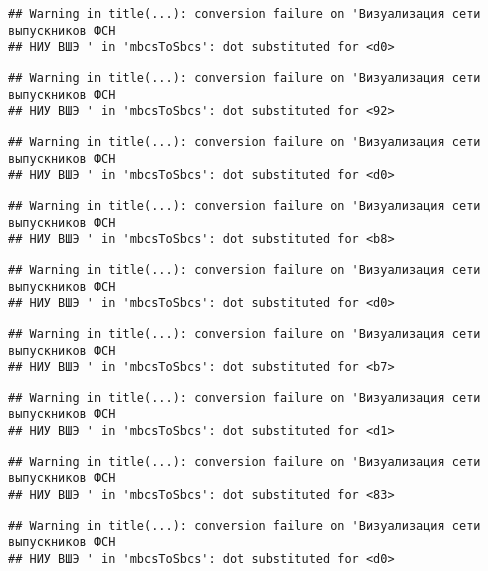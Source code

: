 \documentclass[
]{article}
\begin{document}
\begin{verbatim}
## Warning in title(...): conversion failure on 'Визуализация сети выпускников ФСН
## НИУ ВШЭ ' in 'mbcsToSbcs': dot substituted for <d0>
\end{verbatim}

\begin{verbatim}
## Warning in title(...): conversion failure on 'Визуализация сети выпускников ФСН
## НИУ ВШЭ ' in 'mbcsToSbcs': dot substituted for <92>
\end{verbatim}

\begin{verbatim}
## Warning in title(...): conversion failure on 'Визуализация сети выпускников ФСН
## НИУ ВШЭ ' in 'mbcsToSbcs': dot substituted for <d0>
\end{verbatim}

\begin{verbatim}
## Warning in title(...): conversion failure on 'Визуализация сети выпускников ФСН
## НИУ ВШЭ ' in 'mbcsToSbcs': dot substituted for <b8>
\end{verbatim}

\begin{verbatim}
## Warning in title(...): conversion failure on 'Визуализация сети выпускников ФСН
## НИУ ВШЭ ' in 'mbcsToSbcs': dot substituted for <d0>
\end{verbatim}

\begin{verbatim}
## Warning in title(...): conversion failure on 'Визуализация сети выпускников ФСН
## НИУ ВШЭ ' in 'mbcsToSbcs': dot substituted for <b7>
\end{verbatim}

\begin{verbatim}
## Warning in title(...): conversion failure on 'Визуализация сети выпускников ФСН
## НИУ ВШЭ ' in 'mbcsToSbcs': dot substituted for <d1>
\end{verbatim}

\begin{verbatim}
## Warning in title(...): conversion failure on 'Визуализация сети выпускников ФСН
## НИУ ВШЭ ' in 'mbcsToSbcs': dot substituted for <83>
\end{verbatim}

\begin{verbatim}
## Warning in title(...): conversion failure on 'Визуализация сети выпускников ФСН
## НИУ ВШЭ ' in 'mbcsToSbcs': dot substituted for <d0>
\end{verbatim}
\end{document}
